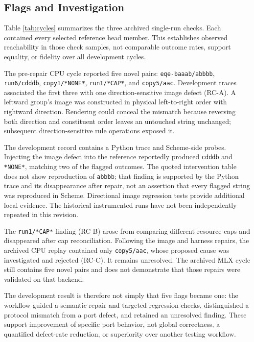 \documentclass[10pt,letterpaper]{article}
\begin{document}
\subsection{Flags and Investigation}\label{sec:results}

Table \ref{tab:cycles} summarizes the three archived single-run checks. Each contained
every selected reference head member. This establishes observed reachability in those
check samples, not comparable outcome rates, support equality, or fidelity over all
development cycles.



The pre-repair CPU cycle reported five novel pairs: \texttt{eqe-baaab/abbbb},
\texttt{run6/cdddb}, \texttt{copy1/*NONE*}, \texttt{run1/*CAP*}, and \texttt{copy5/aac}.
Development traces associated the first three with one direction-sensitive image defect
(RC-A). A leftward group's image was constructed in physical left-to-right order with
rightward direction. Rendering could conceal the mismatch because reversing both direction
and constituent order leaves an untouched string unchanged; subsequent direction-sensitive
rule operations exposed it.

The development record contains a Python trace and Scheme-side probes. Injecting the image
defect into the reference reportedly produced \texttt{cdddb} and \texttt{*NONE*}, matching
two of the flagged outcomes. The quoted intervention table does not show reproduction of
\texttt{abbbb}; that finding is supported by the Python trace and its disappearance after
repair, not an assertion that every flagged string was reproduced in Scheme. Directional
image regression tests provide additional local evidence. The historical instrumented runs
have not been independently repeated in this revision.

The \texttt{run1/*CAP*} finding (RC-B) arose from comparing different resource caps and
disappeared after cap reconciliation. Following the image and harness repairs, the
archived CPU replay contained only \texttt{copy5/aac}, whose proposed cause was
investigated and rejected (RC-C). It remains unresolved. The archived MLX cycle still
contains five novel pairs and does not demonstrate that those repairs were validated on
that backend.

The development result is therefore not simply that five flags became one: the workflow
guided a semantic repair and targeted regression checks, distinguished a protocol mismatch
from a port defect, and retained an unresolved finding. These support improvement of
specific port behavior, not global correctness, a quantified defect-rate reduction, or
superiority over another testing workflow.
\end{document}
